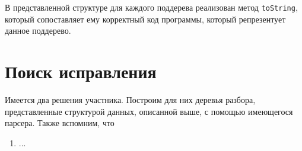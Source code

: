 В представленной структуре для каждого поддерева реализован метод \texttt{toString}, который сопоставляет ему
корректный код программы, который репрезентует данное поддерево. 

\section{Поиск исправления}

Имеется два решения участника. Построим для них деревья разбора, представленные структурой данных, описанной выше, 
с помощью имеющегося парсера. Также вспомним, что 

\chapterconclusion

\begin{enumerate}
    \item ...
\end{enumerate}
